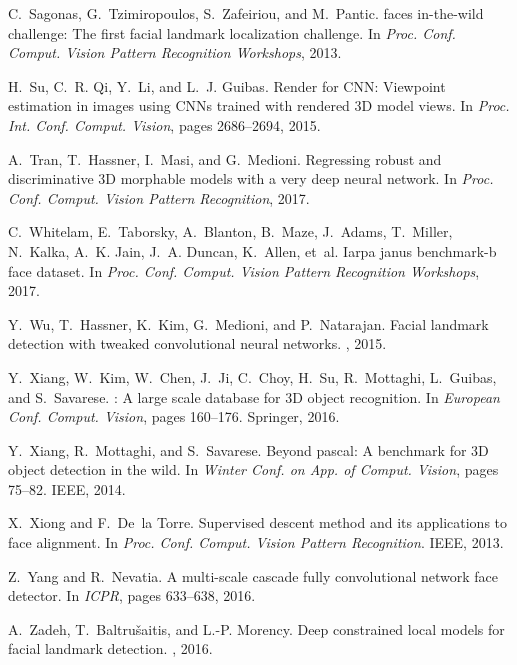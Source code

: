 \documentclass[10pt,twocolumn,letterpaper]{article}
\begin{document}
{\begin{thebibliography}{10}
C.~Sagonas, G.~Tzimiropoulos, S.~Zafeiriou, and M.~Pantic.
 faces in-the-wild challenge: The first facial landmark
  localization challenge.
\newblock In {\em Proc. Conf. Comput. Vision Pattern Recognition Workshops},
  2013.

H.~Su, C.~R. Qi, Y.~Li, and L.~J. Guibas.
\newblock Render for {CNN}: Viewpoint estimation in images using {CNN}s trained
  with rendered {3D} model views.
\newblock In {\em Proc. Int. Conf. Comput. Vision}, pages 2686--2694, 2015.

A.~Tran, T.~Hassner, I.~Masi, and G.~Medioni.
\newblock Regressing robust and discriminative {3D} morphable models with a
  very deep neural network.
\newblock In {\em Proc. Conf. Comput. Vision Pattern Recognition}, 2017.

C.~Whitelam, E.~Taborsky, A.~Blanton, B.~Maze, J.~Adams, T.~Miller, N.~Kalka,
  A.~K. Jain, J.~A. Duncan, K.~Allen, et~al.
\newblock Iarpa janus benchmark-b face dataset.
\newblock In {\em Proc. Conf. Comput. Vision Pattern Recognition Workshops},
  2017.

Y.~Wu, T.~Hassner, K.~Kim, G.~Medioni, and P.~Natarajan.
\newblock Facial landmark detection with tweaked convolutional neural networks.
, 2015.

Y.~Xiang, W.~Kim, W.~Chen, J.~Ji, C.~Choy, H.~Su, R.~Mottaghi, L.~Guibas, and
  S.~Savarese.
: A large scale database for {3D} object recognition.
\newblock In {\em European Conf. Comput. Vision}, pages 160--176. Springer,
  2016.

Y.~Xiang, R.~Mottaghi, and S.~Savarese.
\newblock Beyond pascal: A benchmark for {3D} object detection in the wild.
\newblock In {\em Winter Conf. on App. of Comput. Vision}, pages 75--82. IEEE,
  2014.

X.~Xiong and F.~De~la Torre.
\newblock Supervised descent method and its applications to face alignment.
\newblock In {\em Proc. Conf. Comput. Vision Pattern Recognition}. IEEE, 2013.

Z.~Yang and R.~Nevatia.
\newblock A multi-scale cascade fully convolutional network face detector.
\newblock In {\em ICPR}, pages 633--638, 2016.

A.~Zadeh, T.~Baltru{\v{s}}aitis, and L.-P. Morency.
\newblock Deep constrained local models for facial landmark detection.
, 2016.


\end{thebibliography}}
\end{document}
